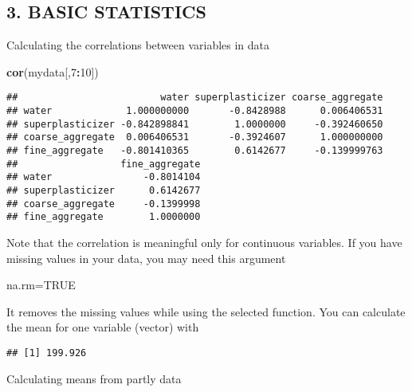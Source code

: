 \documentclass[]{article}
\newenvironment{Shaded}{\begin{snugshade}}{\end{snugshade}}
\newcommand{\DecValTok}[1]{\textcolor[rgb]{0.00,0.00,0.81}{#1}}
\newcommand{\KeywordTok}[1]{\textcolor[rgb]{0.13,0.29,0.53}{\textbf{#1}}}
\newcommand{\NormalTok}[1]{#1}
\newcommand{\OperatorTok}[1]{\textcolor[rgb]{0.81,0.36,0.00}{\textbf{#1}}}
\newcommand{\OtherTok}[1]{\textcolor[rgb]{0.56,0.35,0.01}{#1}}
\begin{document}
\hypertarget{basic-statistics}{%
\subsection{3. BASIC STATISTICS}\label{basic-statistics}}

Calculating the correlations between variables in data

\begin{Shaded}
\begin{Highlighting}[]
\KeywordTok{cor}\NormalTok{(mydata[,}\DecValTok{7}\OperatorTok{:}\DecValTok{10}\NormalTok{])}
\end{Highlighting}
\end{Shaded}

\begin{verbatim}
##                         water superplasticizer coarse_aggregate
## water             1.000000000       -0.8428988      0.006406531
## superplasticizer -0.842898841        1.0000000     -0.392460650
## coarse_aggregate  0.006406531       -0.3924607      1.000000000
## fine_aggregate   -0.801410365        0.6142677     -0.139999763
##                  fine_aggregate
## water                -0.8014104
## superplasticizer      0.6142677
## coarse_aggregate     -0.1399998
## fine_aggregate        1.0000000
\end{verbatim}

Note that the correlation is meaningful only for continuous variables.
If you have missing values in your data, you may need this argument

\begin{Shaded}
\begin{Highlighting}[]
\NormalTok{na.rm=}\OtherTok{TRUE}
\end{Highlighting}
\end{Shaded}

It removes the missing values while using the selected function. You can
calculate the mean for one variable (vector) with

\begin{Shaded}
\end{Shaded}

\begin{verbatim}
## [1] 199.926
\end{verbatim}

Calculating means from partly data
\end{document}
